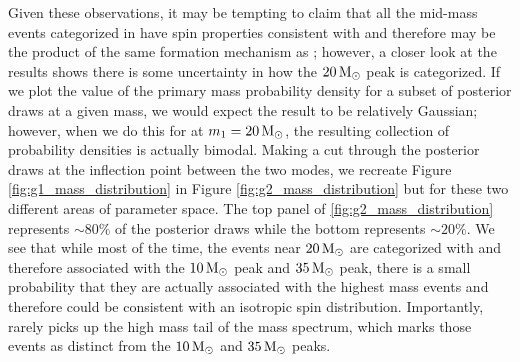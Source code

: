 
Given these observations, it may be tempting to claim that all the mid-mass events categorized in \contA{} have spin properties consistent with \first{} and therefore may be the product of the same formation mechanism as \first{}; however, a closer look at the results shows there is some uncertainty in how the $20 {\,\rm M}_\odot$ peak is categorized. If we plot the value of the primary mass probability density for a subset of posterior draws at a given mass, we would expect the result to be relatively Gaussian; however, when we do this for \contB{} at $m_1 = 20 {\,\rm M}_\odot$, the resulting collection of probability densities is actually bimodal. Making a cut through the posterior draws at the inflection point between the two modes, we recreate Figure \ref{fig:g1_mass_distribution} in Figure \ref{fig:g2_mass_distribution} but for these two different areas of parameter space. The top panel of \ref{fig:g2_mass_distribution} represents $\sim80\%$ of the posterior draws while the bottom represents $\sim20\%$. We see that while most of the time, the events near $20{\,\rm M}_\odot$ are categorized with \contA{} and therefore associated with the $10{\,\rm M}_\odot$ peak and $35{\,\rm M}_\odot$ peak, there is a small probability that they are actually associated with the highest mass events and therefore could be consistent with an isotropic spin distribution. Importantly, \contA{} rarely picks up the high mass tail of the mass spectrum, which marks those events as distinct from the $10{\,\rm M}_\odot$ and $35{\,\rm M}_\odot$ peaks. 

